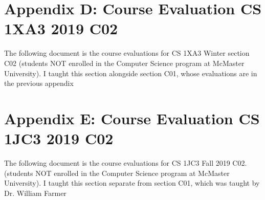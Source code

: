\documentclass[12pt]{report}
\begin{document}


\section{Appendix D: Course Evaluation CS 1XA3 2019 C02}
\label{sec:org92f5d19}
 \label{sec:1xa3c02evals}
The following document is the course evaluations for CS 1XA3 Winter section C02
(students NOT enrolled in the Computer Science program at McMaster University). I
taught this section alongside section C01, whose evaluations are in the
previous appendix



\section{Appendix E: Course Evaluation CS 1JC3 2019 C02}
\label{sec:org80020d4}
 \label{sec:1jc3evals}
The following document is the course evaluations for CS 1JC3 Fall 2019 C02.
(students NOT enrolled in the Computer Science program at McMaster University). I
taught this section separate from section C01, which was taught by Dr. William Farmer  


\end{document}
